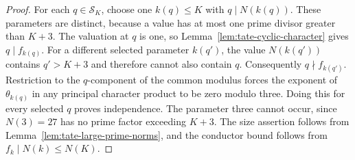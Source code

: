 \documentclass[11pt]{article}
\theoremstyle{definition}
\theoremstyle{remark}
\begin{document}
\begin{proof}
For each $q\in\mathcal S_K$, choose one $k(q)\le K$ with
$q\mid N(k(q))$.  These parameters are distinct, because a
value has at most one prime divisor greater than $K+3$.
The valuation at $q$ is one, so
Lemma~\ref{lem:tate-cyclic-character} gives $q\mid f_{k(q)}$.
For a different selected parameter $k(q')$, the value
$N(k(q'))$ contains $q'>K+3$ and therefore cannot also
contain $q$.  Consequently $q\nmid f_{k(q')}$.
Restriction to the $q$-component of the common modulus forces
the exponent of $\theta_{k(q)}$ in any principal character
product to be zero modulo three.  Doing this for every selected
$q$ proves independence.  The parameter three cannot occur,
since $N(3)=27$ has no prime factor exceeding $K+3$.
The size assertion follows from
Lemma~\ref{lem:tate-large-prime-norms}, and the conductor
bound follows from $f_k\mid N(k)\le N(K)$.
\end{proof}
\end{document}
